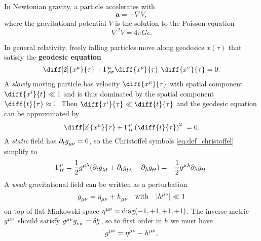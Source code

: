 In Newtonian gravity, a particle accelerates with
\begin{equation}
	\mathbf{a} = - \nabla V ,
	\label{eq:interpretation_m:newton2}
\end{equation}
where the gravitational potential $V$ is the solution to the Poisson equation
\begin{equation}
	\nabla^2 V = 4 \pi G \epsilon .
	\label{eq:interpretation_m:poisson}
\end{equation}

In general relativity, freely falling particles move along geodesics $x(\tau)$ that satisfy the \textbf{geodesic equation}
\begin{equation}
	\diff[2]{x^\mu}{\tau} + \Gamma^\mu_{\rho \sigma} \diff{x^\rho}{\tau} \diff{x^\sigma}{\tau} = 0 .
	\label{eq:geodesic}
\end{equation}
A \emph{slowly} moving particle has velocity $\diff{x^\mu}{\tau}$ with spatial component $\diff{x^i}{t} \ll 1$ and is thus dominated by the spatial component $\diff{t}{\tau} \approx 1$. Then $\diff{x^i}{\tau} \ll \diff{t}{\tau}$ and the geodesic equation can be approximated by
\begin{equation*}
	\diff[2]{x^\mu}{\tau} + \Gamma^\mu_{tt} \left( \diff{t}{\tau} \right)^2 = 0 .
\end{equation*}
A \emph{static} field has $\partial_t g\indices{_\mu_\nu} = 0$, so the Christoffel symbols \eqref{eq:def_christoffel} simplify to
\begin{equation*}
	\Gamma^\mu_{tt} = \frac{1}{2} g\indices{^\mu^\lambda} (\partial_t g\indices{_\lambda_t} + \partial_t g\indices{_t_\lambda} - \partial_\lambda g\indices{_t_t}) = -\frac{1}{2} g\indices{^\mu^\lambda} \partial_\lambda g\indices{_t_t} .
\end{equation*}
A \emph{weak} gravitational field can be written as a perturbation 
\begin{equation}
	g\indices{_\mu_\nu} = \eta\indices{_\mu_\nu} + h\indices{_\mu_\nu}
	\quad \text{with} \quad
	\abs{h\indices{^\mu^\nu}} \ll 1
	\label{eq:weak_field_limit:metric_perturbation}
\end{equation}
on top of flat Minkowski space $\eta\indices{^\mu^\nu} = \text{diag}(-1, +1, +1, +1)$.
The inverse metric $g\indices{^\mu^\nu}$ should satisfy $g\indices{^\mu^\nu} g\indices{_\nu_\sigma} = \delta^\mu_\sigma$, so to first order in $h$ we must have
\begin{equation*}
	g\indices{^\mu^\nu} = \eta\indices{^\mu^\nu} - h\indices{^\mu^\nu} ,
\end{equation*}
